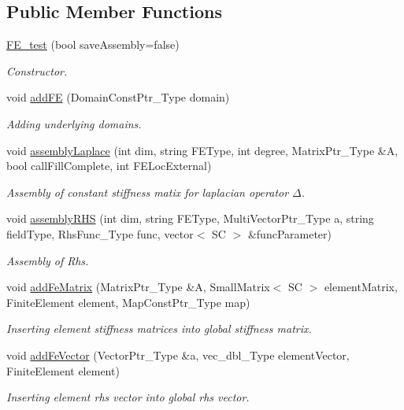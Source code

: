 \subsection*{Public Member Functions}
\begin{DoxyCompactItemize}
\item 
\mbox{\label{classFEDD_1_1FE__test_a2e3b4192d231e6640086213f61baaeba}} 
\hyperlink{classFEDD_1_1FE__test_a2e3b4192d231e6640086213f61baaeba}{F\+E\+\_\+test} (bool save\+Assembly=false)
\begin{DoxyCompactList}\small\item\em Constructor. \end{DoxyCompactList}\item 
void \hyperlink{classFEDD_1_1FE__test_a9bc8d2dd017116bfb6921a1f63fe458a}{add\+FE} (Domain\+Const\+Ptr\+\_\+\+Type domain)
\begin{DoxyCompactList}\small\item\em Adding underlying domains. \end{DoxyCompactList}\item 
void \hyperlink{classFEDD_1_1FE__test_ae576ce75f4d2692b83433f01c08f447a}{assembly\+Laplace} (int dim, string F\+E\+Type, int degree, Matrix\+Ptr\+\_\+\+Type \&A, bool call\+Fill\+Complete, int F\+E\+Loc\+External)
\begin{DoxyCompactList}\small\item\em Assembly of constant stiffness matix for laplacian operator $ \Delta $. \end{DoxyCompactList}\item 
void \hyperlink{classFEDD_1_1FE__test_a755e4ee92ed27e3accfb8c05f234f0eb}{assembly\+R\+HS} (int dim, string F\+E\+Type, Multi\+Vector\+Ptr\+\_\+\+Type a, string field\+Type, Rhs\+Func\+\_\+\+Type func, vector$<$ SC $>$ \&func\+Parameter)
\begin{DoxyCompactList}\small\item\em Assembly of Rhs. \end{DoxyCompactList}\item 
void \hyperlink{classFEDD_1_1FE__test_ac3a835c3218131847be6962a0e256fb2}{add\+Fe\+Matrix} (Matrix\+Ptr\+\_\+\+Type \&A, Small\+Matrix$<$ SC $>$ element\+Matrix, Finite\+Element element, Map\+Const\+Ptr\+\_\+\+Type map)
\begin{DoxyCompactList}\small\item\em Inserting element stiffness matrices into global stiffness matrix. \end{DoxyCompactList}\item 
void \hyperlink{classFEDD_1_1FE__test_a6018698bb792e172da9b790bec29b3f5}{add\+Fe\+Vector} (Vector\+Ptr\+\_\+\+Type \&a, vec\+\_\+dbl\+\_\+\+Type element\+Vector, Finite\+Element element)
\begin{DoxyCompactList}\small\item\em Inserting element rhs vector into global rhs vector. \end{DoxyCompactList}\end{DoxyCompactItemize}
